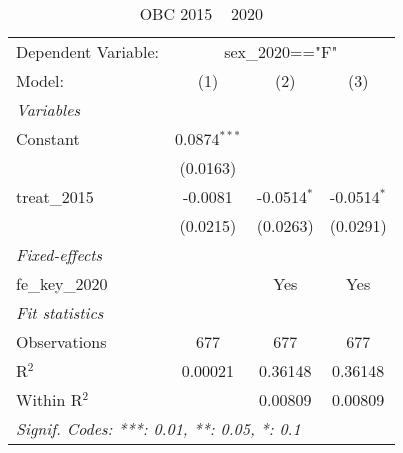 
\begin{table}[htbp]
   \caption{OBC 2015 ~ 2020}
   \centering
   \begin{tabular}{lccc}
      \tabularnewline \midrule \midrule
      Dependent Variable: & \multicolumn{3}{c}{sex\_2020=="F"}\\
      Model:          & (1)            & (2)           & (3)\\  
      \midrule
      \emph{Variables}\\
      Constant        & 0.0874$^{***}$ &               &   \\   
                      & (0.0163)       &               &   \\   
      treat\_2015     & -0.0081        & -0.0514$^{*}$ & -0.0514$^{*}$\\   
                      & (0.0215)       & (0.0263)      & (0.0291)\\   
      \midrule
      \emph{Fixed-effects}\\
      fe\_key\_2020   &                & Yes           & Yes\\  
      \midrule
      \emph{Fit statistics}\\
      Observations    & 677            & 677           & 677\\  
      R$^2$           & 0.00021        & 0.36148       & 0.36148\\  
      Within R$^2$    &                & 0.00809       & 0.00809\\  
      \midrule \midrule
      \multicolumn{4}{l}{\emph{Signif. Codes: ***: 0.01, **: 0.05, *: 0.1}}\\
   \end{tabular}
\end{table}


